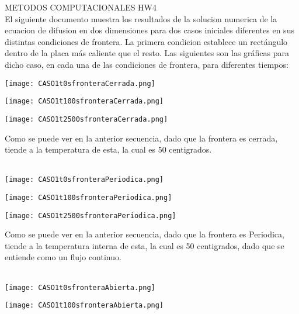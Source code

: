 \documentclass{article}
\begin{document}
METODOS COMPUTACIONALES HW4\\

El siguiente documento muestra los resultados de la solucion numerica de la ecuacion de difusion en dos dimensiones para dos casos iniciales diferentes en sus distintas condiciones de frontera. La primera condicion establece un rectángulo dentro de la placa más caliente que el resto. Las siguientes son las gráficas para dicho caso, en cada una de las condiciones de frontera, para diferentes tiempos:\\

\begin{center}
\texttt{[image: CASO1t0sfronteraCerrada.png]}
\end{center}

\begin{center}
\texttt{[image: CASO1t100sfronteraCerrada.png]}
\end{center}

\begin{center}
\texttt{[image: CASO1t2500sfronteraCerrada.png]}
\end{center}
Como se puede ver en la anterior secuencia, dado que la frontera es cerrada, tiende a la temperatura de esta, la cual es 50 centigrados.\\
\\

\begin{center}
\texttt{[image: CASO1t0sfronteraPeriodica.png]}
\end{center}

\begin{center}
\texttt{[image: CASO1t100sfronteraPeriodica.png]}
\end{center}

\begin{center}
\texttt{[image: CASO1t2500sfronteraPeriodica.png]}
\end{center}
Como se puede ver en la anterior secuencia, dado que la frontera es Periodica, tiende a la temperatura interna de esta, la cual es 50 centigrados, dado que se entiende como un flujo continuo. \\
\\

\begin{center}
\texttt{[image: CASO1t0sfronteraAbierta.png]}
\end{center}

\begin{center}
\texttt{[image: CASO1t100sfronteraAbierta.png]}
\end{center}
\end{document}
